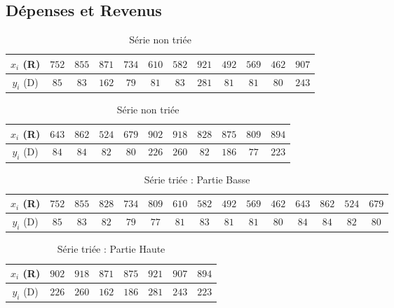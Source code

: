 \documentclass{report}
\begin{document}
      \subsection{Dépenses et Revenus}
      \begin{table}[h]
	\begin{tabular}{| c | c | c | c | c | c | c | c | c | c | c | c |}
	  \hline 
	  $x_{i}$ (R) & $752$ & $855$ & $871$ & $734$ & $610$ & $582$ & $921$ & $492$ & $569$ & $462$ & $907 $ \\ 
	  \hline 
	  $y_{i}$ (D) & $85$ & $83$ & $162$ & $79$ & $81$ & $83$ & $281$ & $81$ & $81$ & $80$ & $243 $ \\ 
	  \hline 
	\end{tabular}
	\newline
	\begin{tabular}{| c | c | c | c | c | c | c | c | c | c | c |}
	\hline 
	$x_{i}$ (R) & $643$ & $862$ & $524$ & $679$ & $902$ & $918$ & $828$ & $875$ & $809$ & $894$ \\ 
	\hline 
	$y_{i}$ (D) & $84$ & $84$ & $82$ & $80$ & $226$ & $260$ & $82$ & $186$ & $77$ & $223$ \\ 
	\hline 
	\end{tabular}
	\caption{Série non triée}
	\label{inter_tp2_ex3_depenses}
      \end{table}
      
      \begin{table}[h]
	\centering
	\begin{tabular}{| c | c | c | c | c | c | c | c | c | c | c | c | c | c | c |}
	  \hline 
	  $x_{i}$ (R) & $752$ & $855$ & $828$ & $734$ & $809$ & $610$ & $582$ & $492$ & $569$ & $462$ & $643$ & $862$ & $524$ & $679$ \\ 
	  \hline 
	  $y_{i}$ (D) & $85$ & $83$ & $82$ & $79$ & $77$ & $81$ & $83$ & $81$ & $81$ & $80$ & $84$ & $84$ & $82$ & $80$ \\ 
	  \hline 
	\end{tabular}
	\caption{Série triée : Partie Basse}
	\label{inter_tp2_ex3_depenses_bas}
      \end{table}
      \begin{table}[h]
	\centering
	\begin{tabular}{| c | c | c | c | c | c | c | c |}
	  \hline 
	  $x_{i}$ (R) & $902$ & $918$ & $871$ & $875$ & $921$ & $907$ & $894$ \\ 
	  \hline 
	  $y_{i}$ (D) & $226$ & $260$ & $162$ & $186$ & $281$ & $243$ & $223$ \\ 
	  \hline 
	\end{tabular}
	\caption{Série triée : Partie Haute}
	\label{inter_tp2_ex3_depenses_haut}
      \end{table}
      
\end{document}
